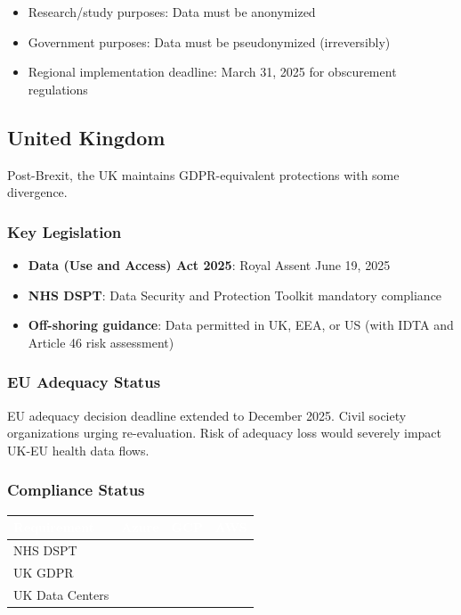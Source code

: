 \documentclass[11pt,a4paper]{article}
\newcommand{\compliant}{\textcolor{msgreen}{\checkmark}}
\begin{document}
\begin{itemize}
    \item Research/study purposes: Data must be anonymized
    \item Government purposes: Data must be pseudonymized (irreversibly)
    \item Regional implementation deadline: March 31, 2025 for obscurement regulations
\end{itemize}

\subsection{United Kingdom}

Post-Brexit, the UK maintains GDPR-equivalent protections with some divergence.

\subsubsection{Key Legislation}

\begin{itemize}
    \item \textbf{Data (Use and Access) Act 2025}: Royal Assent June 19, 2025
    \item \textbf{NHS DSPT}: Data Security and Protection Toolkit mandatory compliance
    \item \textbf{Off-shoring guidance}: Data permitted in UK, EEA, or US (with IDTA and Article 46 risk assessment)
\end{itemize}

\subsubsection{EU Adequacy Status}

EU adequacy decision deadline extended to December 2025. Civil society organizations urging re-evaluation. Risk of adequacy loss would severely impact UK-EU health data flows.

\subsubsection{Compliance Status}

\begin{center}
\begin{tabular}{L{3cm}C{2cm}C{2cm}C{2cm}}
\toprule
{}
\textcolor{white}{\textbf{Requirement}} & \textcolor{white}{\textbf{Azure}} & \textcolor{white}{\textbf{GCP}} & \textcolor{white}{\textbf{AWS}} \\
\midrule
NHS DSPT & \compliant & \compliant & \compliant \\
UK GDPR & \compliant & \compliant & \compliant \\
UK Data Centers & \compliant & \compliant & \compliant \\
\bottomrule
\end{tabular}
\end{center}
\end{document}
